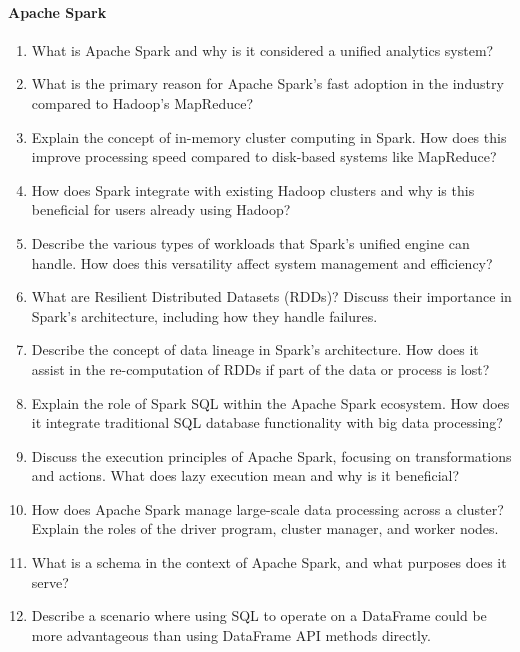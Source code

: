 \paragraph*{Apache Spark}
\begin{enumerate}
    \item What is Apache Spark and why is it considered a unified analytics system?
	\item What is the primary reason for Apache Spark's fast adoption in the industry compared to Hadoop's MapReduce?
    \item Explain the concept of in-memory cluster computing in Spark. How does this improve processing speed compared to disk-based systems like MapReduce?
    \item How does Spark integrate with existing Hadoop clusters and why is this beneficial for users already using Hadoop?
    \item Describe the various types of workloads that Spark's unified engine can handle. How does this versatility affect system management and efficiency?
    \item What are Resilient Distributed Datasets (RDDs)? Discuss their importance in Spark's architecture, including how they handle failures.
	\item Describe the concept of data lineage in Spark's architecture. How does it assist in the re-computation of RDDs if part of the data or process is lost?
    \item Explain the role of Spark SQL within the Apache Spark ecosystem. How does it integrate traditional SQL database functionality with big data processing?
    \item Discuss the execution principles of Apache Spark, focusing on transformations and actions. What does lazy execution mean and why is it beneficial?
    \item How does Apache Spark manage large-scale data processing across a cluster? Explain the roles of the driver program, cluster manager, and worker nodes.
	\item What is a schema in the context of Apache Spark, and what purposes does it serve?
	\item Describe a scenario where using SQL to operate on a DataFrame could be more advantageous than using DataFrame API methods directly.
\end{enumerate}
